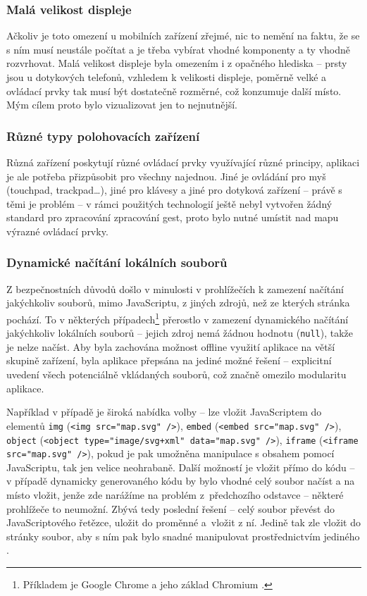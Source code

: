 \subsubsection{Malá velikost displeje}
Ačkoliv je toto omezení u mobilních zařízení zřejmé, nic to nemění na faktu, že se s ním musí neustále počítat a je třeba vybírat vhodné komponenty a ty vhodně rozvrhovat. Malá velikost displeje byla omezením i z opačného hlediska -- prsty jsou u dotykových telefonů, vzhledem k velikosti displeje, poměrně velké a ovládací prvky tak musí být dostatečně rozměrné, což konzumuje další místo. Mým cílem proto bylo vizualizovat jen to nejnutnější.

\subsubsection{Různé typy polohovacích zařízení}
Různá zařízení poskytují různé ovládací prvky využívající různé principy, aplikaci je ale potřeba přizpůsobit pro všechny najednou. Jiné je ovládání pro myš (touchpad, trackpad\dots), jiné pro klávesy a jiné pro dotyková zařízení -- právě s těmi je problém -- v rámci použitých technologií ještě nebyl vytvořen žádný standard pro zpracování zpracování gest, proto bylo nutné umístit nad mapu výrazné ovládací prvky.

\subsubsection{Dynamické načítání lokálních souborů}
Z bezpečnostních důvodů došlo v minulosti v prohlížečích k zamezení načítání jakýchkoliv souborů, mimo JavaScriptu, z jiných zdrojů, než ze kterých stránka pochází. To v některých případech\footnote{Příkladem je Google Chrome a jeho základ Chromium \cite{BugChromeOrigin}.} přerostlo v zamezení dynamického načítání jakýchkoliv lokálních souborů -- jejich zdroj nemá žádnou hodnotu (\texttt{null}), takže je nelze načíst. Aby byla zachována možnost offline využití aplikace na větší skupině zařízení, byla aplikace přepsána na jediné možné řešení -- explicitní uvedení všech potenciálně vkládaných souborů, což značně omezilo modularitu aplikace.

Například v případě  je široká nabídka volby -- lze vložit JavaScriptem do elementů \texttt{img} (\texttt{<img src="map.svg"\ />}), \texttt{embed} (\texttt{<embed src="map.svg"\ />}), \texttt{object} (\texttt{<object type="image/svg+xml"\ data="map.svg"\ />}), \texttt{iframe} (\texttt{<iframe src="map.svg"\ />}), pokud je pak umožněna manipulace s obsahem pomocí JavaScriptu, tak jen velice neohrabaně. Další možností je vložit  přímo do  kódu -- v případě dynamicky generovaného kódu by bylo vhodné celý soubor načíst a na místo vložit, jenže zde narážíme na problém z~předchozího odstavce -- některé prohlížeče to neumožní. Zbývá tedy poslední řešení -- celý soubor převést do JavaScriptového řetězce, uložit do proměnné a~vložit z ní. Jedině tak zle vložit do stránky  soubor, aby s ním pak bylo snadné manipulovat prostřednictvím jediného .

